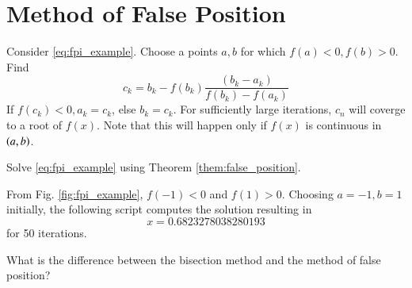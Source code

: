 \documentclass[journal,12pt,twocolumn]{IEEEtran}
\begin{document}
\section{Method of False Position}
%
\begin{theorem}
\label{them:false_position}
Consider \eqref{eq:fpi_example}.  Choose a points $a,b$ for which $f(a) < 0, f(b) > 0$.  
Find \cite{falsepos}
\begin{equation}
c_{k}=b_{k}-f(b_{k}){\frac {(b_{k}-a_{k})}{f(b_{k})-f(a_{k})}}
\end{equation}
If $f(c_k) < 0, a_k = c_k $, else $b_k = c_k$.  For sufficiently large iterations, $c_n$ will coverge to a root of $f(x)$. Note that this will happen only if $f(x)$ is continuous in $\left(a,b\right)$.
\end{theorem}
%
\begin{problem}
Solve \eqref{eq:fpi_example} using Theorem \ref{them:false_position}.
\end{problem}
\solution From Fig. \ref{fig:fpi_example}, $f(-1) < 0$ and $f(1) > 0$.  Choosing $a = -1, b = 1$ initially,
the following script computes the solution resulting in
\begin{equation}
x = 0.6823278038280193
\end{equation}
for 50 iterations.

%
\begin{problem}
What is the difference between the bisection method and the method of false position?
\end{problem}

\end{document}
